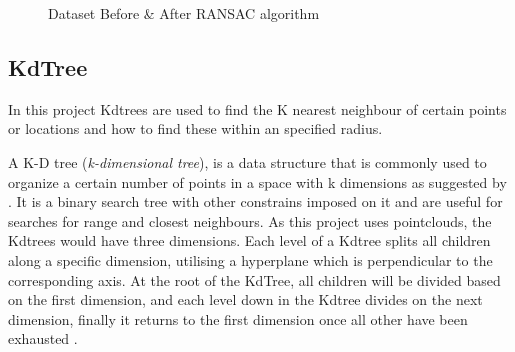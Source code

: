 \documentclass[12pt]{report}
\begin{document}
\begin{figure}[H]%
  \centering
  \qquad
  \caption{Dataset Before \& After RANSAC algorithm }%
  \label{fig:example}%
\end{figure}


\subsection {KdTree}
\label{section:KdTree}
In this project Kdtrees are used to find the K nearest neighbour of certain points or locations and how to find these within an specified radius.

A K-D tree (\textit{k-dimensional tree}), is a data structure that is commonly used  to organize a certain number of points in a space with k dimensions as suggested by .
It is a binary search tree with other constrains imposed on it and are useful for searches for range and closest neighbours.
As this project uses pointclouds, the Kdtrees would have three dimensions. Each level of a Kdtree splits all children along a specific dimension, utilising a hyperplane which is perpendicular to the corresponding axis. 
At the root of the KdTree, all children will be divided based on the first dimension, and each level down in the Kdtree divides on the next dimension, finally it returns to the first dimension once 
all other have been exhausted .
\end{document}
